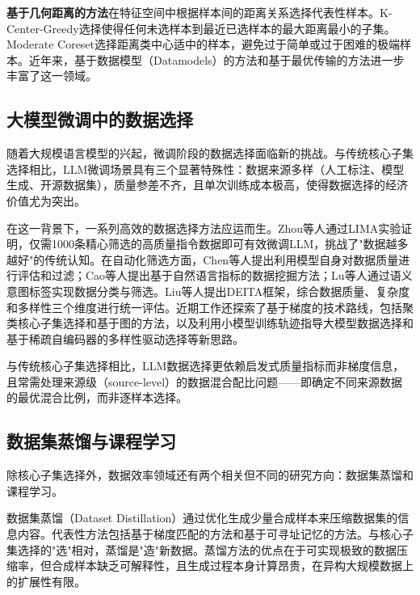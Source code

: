 \textbf{基于几何距离的方法}在特征空间中根据样本间的距离关系选择代表性样本。K-Center-Greedy\cite{sener2018active}选择使得任何未选样本到最近已选样本的最大距离最小的子集。Moderate Coreset\cite{xia2022moderate}选择距离类中心适中的样本，避免过于简单或过于困难的极端样本。近年来，基于数据模型（Datamodels）的方法\cite{ilyas2022datamodels, engstrom2024dsdm}和基于最优传输的方法\cite{xiao2024feature}进一步丰富了这一领域。

\subsection{大模型微调中的数据选择}

随着大规模语言模型的兴起，微调阶段的数据选择面临新的挑战\cite{albalak2024survey}。与传统核心子集选择相比，LLM微调场景具有三个显著特殊性：数据来源多样（人工标注、模型生成、开源数据集），质量参差不齐，且单次训练成本极高\cite{rae2021scaling}，使得数据选择的经济价值尤为突出。

在这一背景下，一系列高效的数据选择方法应运而生。Zhou等人\cite{zhou2023lima}通过LIMA实验证明，仅需1000条精心筛选的高质量指令数据即可有效微调LLM，挑战了"数据越多越好"的传统认知。在自动化筛选方面，Chen等人\cite{chen2023alpagasus}提出利用模型自身对数据质量进行评估和过滤；Cao等人\cite{cao2023instruction}提出基于自然语言指标的数据挖掘方法；Lu等人\cite{lu2023instag}通过语义意图标签实现数据分类与筛选。Liu等人\cite{liu2023what}提出DEITA框架，综合数据质量、复杂度和多样性三个维度进行统一评估。近期工作还探索了基于梯度的技术路线，包括聚类核心子集选择\cite{zhang2024tagcos}和基于图的方法\cite{zhao2025beyond}，以及利用小模型训练轨迹指导大模型数据选择\cite{yang2024smalltolarge}和基于稀疏自编码器的多样性驱动选择\cite{yang2025diversity}等新思路。

与传统核心子集选择相比，LLM数据选择更依赖启发式质量指标而非梯度信息，且常需处理来源级（source-level）的数据混合配比问题——即确定不同来源数据的最优混合比例，而非逐样本选择。

\subsection{数据集蒸馏与课程学习}

除核心子集选择外，数据效率领域还有两个相关但不同的研究方向：数据集蒸馏和课程学习。

数据集蒸馏（Dataset Distillation）\cite{wang2018dataset}通过优化生成少量合成样本来压缩数据集的信息内容。代表性方法包括基于梯度匹配的方法\cite{cazenavette2022dataset}和基于可寻址记忆的方法\cite{deng2022remember}。与核心子集选择的"选"相对，蒸馏是"造"新数据\cite{yu2023dataset}。蒸馏方法的优点在于可实现极致的数据压缩率，但合成样本缺乏可解释性，且生成过程本身计算昂贵，在异构大规模数据上的扩展性有限。

